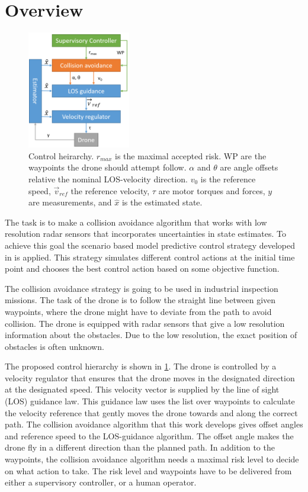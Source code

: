 \section{Overview}

\begin{figure}
    \centering
    \includegraphics[width = 0.4\textwidth]{Figures/ControlHeirarchy}
    \caption{Control heirarchy. $r_{max}$ is the maximal accepted risk. WP are the waypoints the drone should attempt follow. $\alpha$ and $\theta$ are angle offsets relative the nominal LOS-velocity direction. $v_0$ is the reference speed, $\vec{v}_{ref}$ the reference velocity, $\tau$ are motor torques and forces, $y$ are measurements, and $\hat{x}$ is the estimated state. }
    \label{fig:ControlHeirachy}
\end{figure}

The task is to make a collision avoidance algorithm that works with low resolution radar sensors that incorporates uncertainties in state estimates. To achieve this goal the scenario based model predictive control strategy developed in \cite{Johansen2016} is applied. This strategy simulates different control actions at the initial time point and chooses the best control action based on some objective function. 

The collision avoidance strategy is going to be used in industrial inspection missions. The task of the drone is to follow the straight line between given waypoints, where the drone might have to deviate from the path to avoid collision. The drone is equipped with radar sensors that give a low resolution information about the obstacles. Due to the low resolution, the exact position of obstacles is often unknown. 

The proposed control hierarchy is shown in \ref{fig:ControlHeirachy}. The drone is controlled by a velocity regulator that ensures that the drone moves in the designated direction at the designated speed. This velocity vector is supplied by the line of sight (LOS) guidance law. This guidance law uses the list over waypoints to calculate the velocity reference that gently moves the drone towards and along the correct path. The collision avoidance algorithm that this work develops gives offset angles and reference speed to the LOS-guidance algorithm. The offset angle makes the drone fly in a different direction than the planned path. In addition to the waypoints, the collision avoidance algorithm needs a maximal risk level to decide on what action to take. The risk level and waypoints have to be delivered from either a supervisory controller, or a human operator. 

